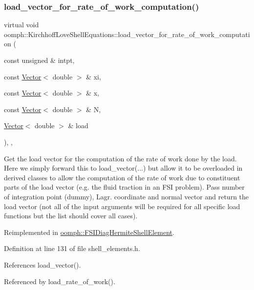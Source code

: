 \subsubsection{\texorpdfstring{load\+\_\+vector\+\_\+for\+\_\+rate\+\_\+of\+\_\+work\+\_\+computation()}{load\_vector\_for\_rate\_of\_work\_computation()}}
{\footnotesize\ttfamily virtual void oomph\+::\+Kirchhoff\+Love\+Shell\+Equations\+::load\+\_\+vector\+\_\+for\+\_\+rate\+\_\+of\+\_\+work\+\_\+computation (\begin{DoxyParamCaption}\item[{const unsigned \&}]{intpt,  }\item[{const \hyperlink{classoomph_1_1Vector}{Vector}$<$ double $>$ \&}]{xi,  }\item[{const \hyperlink{classoomph_1_1Vector}{Vector}$<$ double $>$ \&}]{x,  }\item[{const \hyperlink{classoomph_1_1Vector}{Vector}$<$ double $>$ \&}]{N,  }\item[{\hyperlink{classoomph_1_1Vector}{Vector}$<$ double $>$ \&}]{load }\end{DoxyParamCaption})\hspace{0.3cm}{\ttfamily [inline]}, {\ttfamily [protected]}, {\ttfamily [virtual]}}



Get the load vector for the computation of the rate of work done by the load. Here we simply forward this to load\+\_\+vector(...) but allow it to be overloaded in derived classes to allow the computation of the rate of work due to constituent parts of the load vector (e.\+g. the fluid traction in an F\+SI problem). Pass number of integration point (dummy), Lagr. coordinate and normal vector and return the load vector (not all of the input arguments will be required for all specific load functions but the list should cover all cases). 



Reimplemented in \hyperlink{classoomph_1_1FSIDiagHermiteShellElement_ad57fbbe43b255ff6429c43366fb5d64a}{oomph\+::\+F\+S\+I\+Diag\+Hermite\+Shell\+Element}.



Definition at line 131 of file shell\+\_\+elements.\+h.



References load\+\_\+vector().



Referenced by load\+\_\+rate\+\_\+of\+\_\+work().

\mbox{\label{classoomph_1_1KirchhoffLoveShellEquations_a20116921726629d31d82bc55cb09130f}} 
